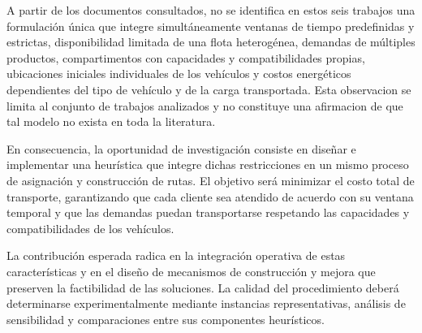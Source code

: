 A partir de los documentos consultados, no se identifica en estos seis trabajos una formulación única que integre simultáneamente ventanas de tiempo predefinidas y estrictas, disponibilidad limitada de una flota heterogénea, demandas de múltiples productos, compartimentos con capacidades y compatibilidades propias, ubicaciones iniciales individuales de los vehículos y costos energéticos dependientes del tipo de vehículo y de la carga transportada. Esta observacion se limita al conjunto de trabajos analizados y no constituye una afirmacion de que tal modelo no exista en toda la literatura.

En consecuencia, la oportunidad de investigación consiste en diseñar e implementar una heurística que integre dichas restricciones en un mismo proceso de asignación y construcción de rutas. El objetivo será minimizar el costo total de transporte, garantizando que cada cliente sea atendido de acuerdo con su ventana temporal y que las demandas puedan transportarse respetando las capacidades y compatibilidades de los vehículos.

La contribución esperada radica en la integración operativa de estas características y en el diseño de mecanismos de construcción y mejora que preserven la factibilidad de las soluciones. La calidad del procedimiento deberá determinarse experimentalmente mediante instancias representativas, análisis de sensibilidad y comparaciones entre sus componentes heurísticos.

